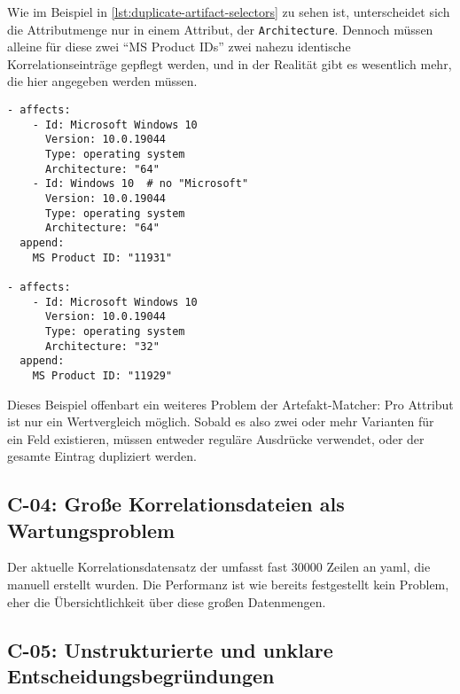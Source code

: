 Wie im Beispiel in \autoref{lst:duplicate-artifact-selectors} zu sehen ist, unterscheidet sich die Attributmenge nur in einem Attribut, der \texttt{Architecture}.
Dennoch müssen alleine für diese zwei \enquote{MS Product IDs} zwei nahezu identische Korrelationseinträge gepflegt werden, und in der Realität gibt es wesentlich mehr, die hier angegeben werden müssen.

\begin{lstlisting}[style=yaml,caption={Zwei Korrelationseinträge mit nahezu identischen Attributen},label={lst:duplicate-artifact-selectors}]
- affects:
    - Id: Microsoft Windows 10
      Version: 10.0.19044
      Type: operating system
      Architecture: "64"
    - Id: Windows 10  # no "Microsoft"
      Version: 10.0.19044
      Type: operating system
      Architecture: "64"
  append:
    MS Product ID: "11931"

- affects:
    - Id: Microsoft Windows 10
      Version: 10.0.19044
      Type: operating system
      Architecture: "32"
  append:
    MS Product ID: "11929"
\end{lstlisting}

Dieses Beispiel offenbart ein weiteres Problem der Artefakt-Matcher:
Pro Attribut ist nur ein Wertvergleich möglich.
Sobald es also zwei oder mehr Varianten für ein Feld existieren, müssen entweder reguläre Ausdrücke verwendet, oder der gesamte Eintrag dupliziert werden.

\subsection{C-04: Große Korrelationsdateien als Wartungsproblem}\label{subsec:c-04-groe-und-unubersichtliche-yaml-dateien}


Der aktuelle Korrelationsdatensatz der \metaeffektsp umfasst fast 30000 Zeilen an \acrshort{yaml}, die manuell erstellt wurden.
Die Performanz ist wie bereits festgestellt kein Problem, eher die Übersichtlichkeit über diese großen Datenmengen.

\subsection{C-05: Unstrukturierte und unklare Entscheidungsbegründungen}\label{subsec:c-05-reason-not-good-enough}

